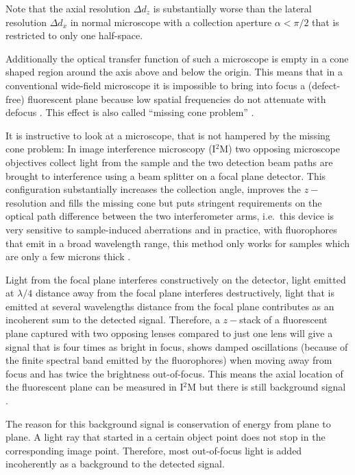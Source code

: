Note that the axial resolution $\Delta d_z$ is substantially worse
than the lateral resolution $\Delta d_x$ in normal microscope with a
collection aperture $\alpha<\pi/2$ that is restricted to only one
half-space.

Additionally the optical transfer function of such a microscope is
empty in a cone shaped region around the axis above and below the
origin.  This means that in a conventional wide-field microscope it is
impossible to bring into focus a (defect-free) fluorescent plane
because low spatial frequencies do not attenuate with defocus
\citep{Neil1997}. This effect is also called ``missing cone problem''
\citep{Streibl1984}.

It is instructive to look at a microscope, that is not hampered by the
missing cone problem: In image interference microscopy (I${}^2$M) two
opposing microscope objectives collect light from the sample and the
two detection beam paths are brought to interference using a beam
splitter on a focal plane detector. This configuration substantially
increases the collection angle, improves the $z-$resolution and fills
the missing cone but puts stringent requirements on the optical path
difference between the two interferometer arms, i.e.\ this device is
very sensitive to sample-induced aberrations and in practice, with
fluorophores that emit in a broad wavelength range, this method only
works for samples which are only a few microns thick
\citep{Gustafsson1999}.



Light from the focal plane interferes constructively on the detector,
light emitted at $\lambda/4$ distance away from the focal plane
interferes destructively, light that is emitted at several wavelengths
distance from the focal plane contributes as an incoherent sum to the
detected signal. Therefore, a $z-$stack of a fluorescent plane captured
with two opposing lenses compared to just one lens will give a signal
that is four times as bright in focus, shows damped oscillations
(because of the finite spectral band emitted by the fluorophores) when
moving away from focus and has twice the brightness out-of-focus. This
means the axial location of the fluorescent plane can be measured in
I${}^2$M but there is still background signal \citep{Gustafsson1995}.

The reason for this background signal is conservation of energy from
plane to plane. A light ray that started in a certain object point
does not stop in the corresponding image point. Therefore, most
out-of-focus light is added incoherently as a background to the
detected signal.

